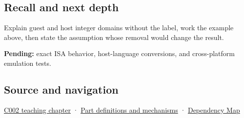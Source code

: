 \subsection{Recall and next depth}\label{appendix-33e7a011b684-recall-and-next-depth}

Explain guest and host integer domains without the label, work the example above, then state the assumption whose removal would change the result.

\textbf{Pending:} exact ISA behavior, host-language conversions, and cross-platform emulation tests.

\subsection{Source and navigation}\label{appendix-33e7a011b684-source-and-navigation}

\hyperref[01-foundations-i-ch001-arithmetic-becomes-a-policy]{C002 teaching chapter} · \hyperref[appendix-fd090d982a15]{Part definitions and mechanisms} · \hyperref[appendix-4ad47bdd269a]{Dependency Map}
